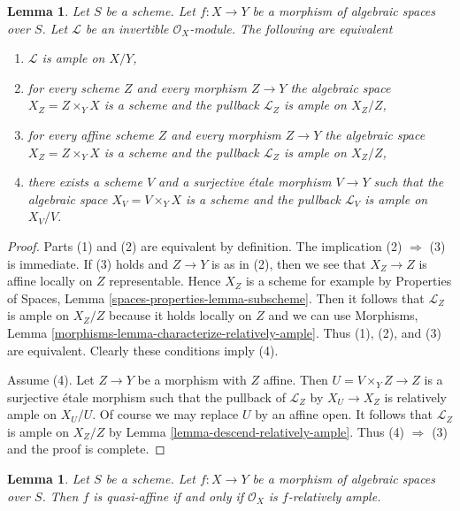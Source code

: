 \documentclass{stacks-project}
\theoremstyle{plain}
\newtheorem{lemma}[subsection]{Lemma}
\theoremstyle{definition}
\theoremstyle{remark}
\numberwithin{equation}{subsection}
\begin{document}
\begin{lemma}
\label{lemma-relatively-ample-local}
Let $S$ be a scheme. Let $f : X \to Y$ be a morphism of algebraic spaces
over $S$. Let $\mathcal{L}$ be an invertible $\mathcal{O}_X$-module.
The following are equivalent
\begin{enumerate}
\item $\mathcal{L}$ is ample on $X/Y$,
\item for every scheme $Z$ and every morphism $Z \to Y$
the algebraic space $X_Z = Z \times_Y X$ is a scheme
and the pullback $\mathcal{L}_Z$ is ample on $X_Z/Z$,
\item for every affine scheme $Z$ and every morphism $Z \to Y$
the algebraic space $X_Z = Z \times_Y X$ is a scheme
and the pullback $\mathcal{L}_Z$ is ample on $X_Z/Z$,
\item there exists a scheme $V$ and a surjective \'etale morphism
$V \to Y$ such that the algebraic space $X_V = V \times_Y X$ is a scheme
and the pullback $\mathcal{L}_V$ is ample on $X_V/V$.
\end{enumerate}
\end{lemma}

\begin{proof}
Parts (1) and (2) are equivalent by definition.
The implication (2) $\Rightarrow$ (3) is immediate.
If (3) holds and $Z \to Y$ is as in (2), then we see
that $X_Z \to Z$ is affine locally on $Z$ representable.
Hence $X_Z$ is a scheme for example by
Properties of Spaces, Lemma \ref{spaces-properties-lemma-subscheme}.
Then it follows that $\mathcal{L}_Z$ is ample on $X_Z/Z$ because
it holds locally on $Z$ and we can use
Morphisms, Lemma \ref{morphisms-lemma-characterize-relatively-ample}.
Thus (1), (2), and (3) are equivalent. Clearly these conditions
imply (4).

\medskip\noindent
Assume (4). Let $Z \to Y$ be a morphism with $Z$ affine.
Then $U = V \times_Y Z \to Z$ is a surjective \'etale morphism
such that the pullback of $\mathcal{L}_Z$ by $X_U \to X_Z$
is relatively ample on $X_U/U$.
Of course we may replace $U$ by an affine open.
It follows that $\mathcal{L}_Z$ is ample on $X_Z/Z$ by
Lemma \ref{lemma-descend-relatively-ample}.
Thus (4) $\Rightarrow$ (3) and the proof is complete.
\end{proof}

\begin{lemma}
\label{lemma-quasi-affine-O-ample}
Let $S$ be a scheme. Let $f : X \to Y$ be a morphism of algebraic spaces
over $S$. Then $f$ is quasi-affine if and only if $\mathcal{O}_X$
is $f$-relatively ample.
\end{lemma}
\end{document}
